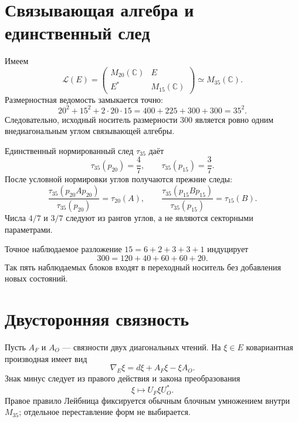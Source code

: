 \section{Связывающая алгебра и единственный след}

Имеем
\begin{equation}
 \mathcal L(E)=
 \begin{pmatrix}
  M_{20}(\mathbb C)&E\\
  E^*&M_{15}(\mathbb C)
 \end{pmatrix}
 \simeq M_{35}(\mathbb C).
 \label{eq:v5-morita-linking-algebra}
\end{equation}
Размерностная ведомость замыкается точно:
\begin{equation}
 20^2+15^2+2\cdot20\cdot15
 =400+225+300+300=35^2.
\end{equation}
Следовательно, исходный носитель размерности 300 является ровно одним
внедиагональным углом связывающей алгебры.

Единственный нормированный след $\tau_{35}$ даёт
\begin{equation}
 \tau_{35}(p_{20})=\frac47,
 \qquad
 \tau_{35}(p_{15})=\frac37.
\end{equation}
После условной нормировки углов получаются прежние следы:
\begin{equation}
 \frac{\tau_{35}(p_{20}Ap_{20})}{\tau_{35}(p_{20})}=\tau_{20}(A),
 \qquad
 \frac{\tau_{35}(p_{15}Bp_{15})}{\tau_{35}(p_{15})}=\tau_{15}(B).
 \label{eq:v5-conditioned-linking-traces}
\end{equation}
Числа $4/7$ и $3/7$ следуют из рангов углов, а не являются секторными
параметрами.

Точное наблюдаемое разложение $15=6+2+3+3+1$ индуцирует
\begin{equation}
 300=120+40+60+60+20.
 \label{eq:v5-observed-linking-blocks}
\end{equation}
Так пять наблюдаемых блоков входят в переходный носитель без добавления
новых состояний.

\section{Двусторонняя связность}

Пусть $A_F$ и $A_O$ --- связности двух диагональных чтений. На
$\xi\in E$ ковариантная производная имеет вид
\begin{equation}
 \nabla_E\xi=d\xi+A_F\xi-\xi A_O.
 \label{eq:v5-morita-bimodule-connection}
\end{equation}
Знак минус следует из правого действия и закона преобразования
\begin{equation}
 \xi\longmapsto U_F\xi U_O^*.
\end{equation}
Правое правило Лейбница фиксируется обычным блочным умножением внутри
$M_{35}$; отдельное переставление форм не выбирается.

